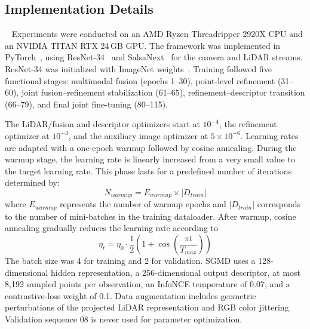 \subsection{Implementation Details}~\label{subsec:implementation-details}
Experiments were conducted on an AMD Ryzen Threadripper 2920X CPU and an NVIDIA TITAN RTX 24\,GB GPU. The framework was implemented in PyTorch~\cite{paszke2019pytorchimperativestylehighperformance}, using ResNet-34~\cite{he2015deepresiduallearningimage} and SalsaNext~\cite{cortinhal2024salsanextfastuncertaintyawaresemantic} for the camera and LiDAR streams. ResNet-34 was initialized with ImageNet weights~\cite{deng2009imagenet}. Training followed five functional stages: multimodal fusion (epochs 1--30), point-level refinement (31--60), joint fusion--refinement stabilization (61--65), refinement--descriptor transition (66--79), and final joint fine-tuning (80--115).

The LiDAR/fusion and descriptor optimizers start at $10^{-4}$, the refinement optimizer at $10^{-3}$, and the auxiliary image optimizer at $5\times10^{-6}$. Learning rates are adapted with a one-epoch warmup followed by cosine annealing.
During the warmup stage, the learning rate is linearly increased from a very small value to the target learning rate. This phase lasts for a predefined number of iterations determined by:
\begin{equation}
    N_{warmup} = E_{warmup} \times |D_{train}|
\end{equation}
where $E_{warmup}$ represents the number of warmup epochs and $|D_{train}|$ corresponds to the number of mini-batches in the training dataloader. After warmup, cosine annealing gradually reduces the learning rate according to
\begin{equation}
    \eta_t = \eta_0 \cdot \frac{1}{2} \left (1 + \cos \left (\frac{\pi t}{T_{max}} \right ) \right )
\end{equation}
The batch size was 4 for training and 2 for validation. SGMD uses a 128-dimensional hidden representation, a 256-dimensional output descriptor, at most 8,192 sampled points per observation, an InfoNCE temperature of 0.07, and a contrastive-loss weight of 0.1. Data augmentation includes geometric perturbations of the projected LiDAR representation and RGB color jittering. Validation sequence 08 is never used for parameter optimization.

